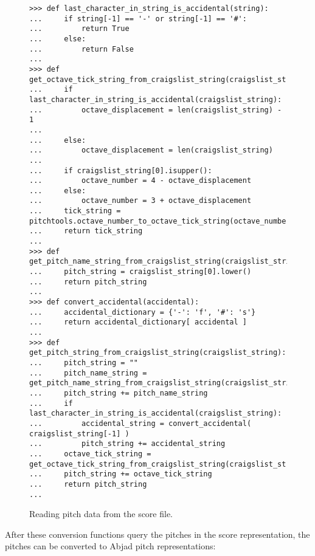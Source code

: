 \begin{figure}[H]
\begin{lstlisting}[basicstyle=\scriptsize\ttfamily, breaklines=True, tabsize=4, showtabs=false, showspaces=false]
>>> def last_character_in_string_is_accidental(string):
...     if string[-1] == '-' or string[-1] == '#':
...         return True
...     else:
...         return False
... 
>>> def get_octave_tick_string_from_craigslist_string(craigslist_string):
...     if last_character_in_string_is_accidental(craigslist_string):
...         octave_displacement = len(craigslist_string) - 1
...     
...     else:
...         octave_displacement = len(craigslist_string)
...     
...     if craigslist_string[0].isupper():
...         octave_number = 4 - octave_displacement
...     else:
...         octave_number = 3 + octave_displacement
...     tick_string = pitchtools.octave_number_to_octave_tick_string(octave_number)
...     return tick_string
... 
>>> def get_pitch_name_string_from_craigslist_string(craigslist_string):
...     pitch_string = craigslist_string[0].lower()
...     return pitch_string
... 
>>> def convert_accidental(accidental):
...     accidental_dictionary = {'-': 'f', '#': 's'}
...     return accidental_dictionary[ accidental ]
... 
>>> def get_pitch_string_from_craigslist_string(craigslist_string):
...     pitch_string = ""
...     pitch_name_string = get_pitch_name_string_from_craigslist_string(craigslist_string)
...     pitch_string += pitch_name_string
...     if last_character_in_string_is_accidental(craigslist_string):
...         accidental_string = convert_accidental( craigslist_string[-1] )
...         pitch_string += accidental_string
...     octave_tick_string = get_octave_tick_string_from_craigslist_string(craigslist_string)
...     pitch_string += octave_tick_string
...     return pitch_string
... \end{lstlisting}

\caption{Reading pitch data from the score file. } 
\end{figure}

After these conversion functions query the pitches in the score representation, the pitches can be converted to Abjad pitch representations:

